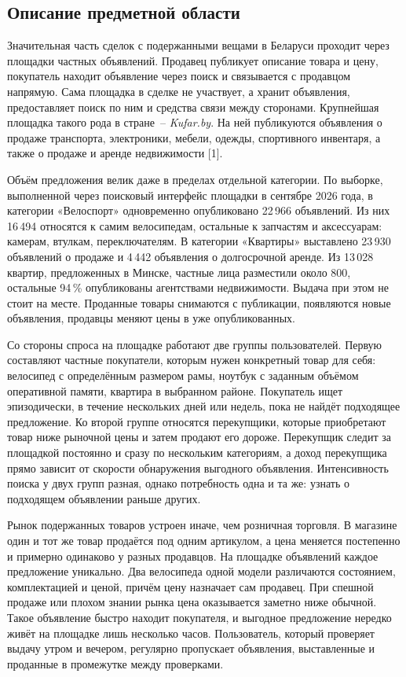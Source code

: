 \subsection{Описание предметной области}
\label{sec:analysis:domain}

Значительная часть сделок с подержанными вещами в Беларуси проходит через площадки частных объявлений. Продавец публикует описание товара и цену, покупатель находит объявление через поиск и связывается с продавцом напрямую. Сама площадка в сделке не участвует, а хранит объявления, предоставляет поиск по ним и средства связи между сторонами. Крупнейшая площадка такого рода в стране~-- \textit{Kufar.by}. На ней публикуются объявления о продаже транспорта, электроники, мебели, одежды, спортивного инвентаря, а также о продаже и аренде недвижимости [1].

Объём предложения велик даже в пределах отдельной категории. По выборке, выполненной через поисковый интерфейс площадки в сентябре 2026 года, в категории «Велоспорт» одновременно опубликовано 22\,966 объявлений. Из них 16\,494 относятся к самим велосипедам, остальные к запчастям и аксессуарам: камерам, втулкам, переключателям. В категории «Квартиры» выставлено 23\,930 объявлений о продаже и 4\,442 объявления о долгосрочной аренде. Из 13\,028 квартир, предложенных в Минске, частные лица разместили около 800, остальные 94\,\% опубликованы агентствами недвижимости. Выдача при этом не стоит на месте. Проданные товары снимаются с публикации, появляются новые объявления, продавцы меняют цены в уже опубликованных.

Со стороны спроса на площадке работают две группы пользователей. Первую составляют частные покупатели, которым нужен конкретный товар для себя: велосипед с определённым размером рамы, ноутбук с заданным объёмом оперативной памяти, квартира в выбранном районе. Покупатель ищет эпизодически, в течение нескольких дней или недель, пока не найдёт подходящее предложение. Ко второй группе относятся перекупщики, которые приобретают товар ниже рыночной цены и затем продают его дороже. Перекупщик следит за площадкой постоянно и сразу по нескольким категориям, а доход перекупщика прямо зависит от скорости обнаружения выгодного объявления. Интенсивность поиска у двух групп разная, однако потребность одна и та же: узнать о подходящем объявлении раньше других.

Рынок подержанных товаров устроен иначе, чем розничная торговля. В магазине один и тот же товар продаётся под одним артикулом, а цена меняется постепенно и примерно одинаково у разных продавцов. На площадке объявлений каждое предложение уникально. Два велосипеда одной модели различаются состоянием, комплектацией и ценой, причём цену назначает сам продавец. При спешной продаже или плохом знании рынка цена оказывается заметно ниже обычной. Такое объявление быстро находит покупателя, и выгодное предложение нередко живёт на площадке лишь несколько часов. Пользователь, который проверяет выдачу утром и вечером, регулярно пропускает объявления, выставленные и проданные в промежутке между проверками.


